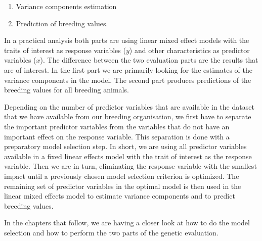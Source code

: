 \documentclass[
]{book}
\providecommand{\tightlist}{%
  \setlength{\itemsep}{0pt}\setlength{\parskip}{0pt}}
\begin{document}
\begin{enumerate}
\def\labelenumi{\arabic{enumi}.}
\tightlist
\item
  Variance components estimation
\item
  Prediction of breeding values.
\end{enumerate}

In a practical analysis both parts are using linear mixed effect models with the traits of interest as response variables (\(y\)) and other characteristics as predictor variables (\(x\)). The difference between the two evaluation parts are the results that are of interest. In the first part we are primarily looking for the estimates of the variance components in the model. The second part produces predictions of the breeding values for all breeding animals.

Depending on the number of predictor variables that are available in the dataset that we have available from our breeding organisation, we first have to separate the important predictor variables from the variables that do not have an important effect on the response variable. This separation is done with a preparatory model selection step. In short, we are using all predictor variables available in a fixed linear effects model with the trait of interest as the response variable. Then we are in turn, eliminating the response variable with the smallest impact until a previously chosen model selection criterion is optimized. The remaining set of predictor variables in the optimal model is then used in the linear mixed effects model to estimate variance components and to predict breeding values.

In the chapters that follow, we are having a closer look at how to do the model selection and how to perform the two parts of the genetic evaluation.

  
\end{document}
